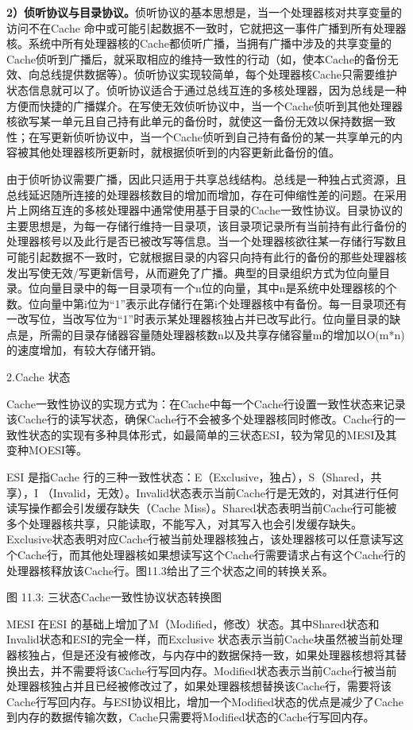 \documentclass[]{ctexbook}
\begin{document}
\textbf{2）侦听协议与目录协议。}侦听协议的基本思想是，当一个处理器核对共享变量的访问不在Cache 命中或可能引起数据不一致时，它就把这一事件广播到所有处理器核。系统中所有处理器核的Cache都侦听广播，当拥有广播中涉及的共享变量的Cache侦听到广播后，就采取相应的维持一致性的行动（如，使本Cache的备份无效、向总线提供数据等）。侦听协议实现较简单，每个处理器核Cache只需要维护状态信息就可以了。侦听协议适合于通过总线互连的多核处理器，因为总线是一种方便而快捷的广播媒介。在写使无效侦听协议中，当一个Cache侦听到其他处理器核欲写某一单元且自己持有此单元的备份时，就使这一备份无效以保持数据一致性；在写更新侦听协议中，当一个Cache侦听到自己持有备份的某一共享单元的内容被其他处理器核所更新时，就根据侦听到的内容更新此备份的值。

由于侦听协议需要广播，因此只适用于共享总线结构。总线是一种独占式资源，且总线延迟随所连接的处理器核数目的增加而增加，存在可伸缩性差的问题。在采用片上网络互连的多核处理器中通常使用基于目录的Cache一致性协议。目录协议的主要思想是，为每一存储行维持一目录项，该目录项记录所有当前持有此行备份的处理器核号以及此行是否已被改写等信息。当一个处理器核欲往某一存储行写数且可能引起数据不一致时，它就根据目录的内容只向持有此行的备份的那些处理器核发出写使无效/写更新信号，从而避免了广播。典型的目录组织方式为位向量目录。位向量目录中的每一目录项有一个n位的向量，其中n是系统中处理器核的个数。位向量中第i位为``1''表示此存储行在第i个处理器核中有备份。每一目录项还有一改写位，当改写位为``1''时表示某处理器核独占并已改写此行。位向量目录的缺点是，所需的目录存储器容量随处理器核数n以及共享存储容量m的增加以O(m*n)的速度增加，有较大存储开销。

2.Cache 状态

Cache一致性协议的实现方式为：在Cache中每一个Cache行设置一致性状态来记录该Cache行的读写状态，确保Cache行不会被多个处理器核同时修改。Cache行的一致性状态的实现有多种具体形式，如最简单的三状态ESI，较为常见的MESI及其变种MOESI等。

ESI 是指Cache 行的三种一致性状态：E（Exclusive，独占），S（Shared，共享），I （Invalid，无效）。Invalid状态表示当前Cache行是无效的，对其进行任何读写操作都会引发缓存缺失（Cache Miss）。Shared状态表明当前Cache行可能被多个处理器核共享，只能读取，不能写入，对其写入也会引发缓存缺失。Exclusive状态表明对应Cache行被当前处理器核独占，该处理器核可以任意读写这个Cache行，而其他处理器核如果想读写这个Cache行需要请求占有这个Cache行的处理器核释放该Cache行。图11.3给出了三个状态之间的转换关系。

图 11.3: 三状态Cache一致性协议状态转换图

MESI 在ESI 的基础上增加了M（Modified，修改）状态。其中Shared状态和Invalid状态和ESI的完全一样，而Exclusive 状态表示当前Cache块虽然被当前处理器核独占，但是还没有被修改，与内存中的数据保持一致，如果处理器核想将其替换出去，并不需要将该Cache行写回内存。Modified状态表示当前Cache行被当前处理器核独占并且已经被修改过了，如果处理器核想替换该Cache行，需要将该Cache行写回内存。与ESI协议相比，增加一个Modified状态的优点是减少了Cache到内存的数据传输次数，Cache只需要将Modified状态的Cache行写回内存。
\end{document}
